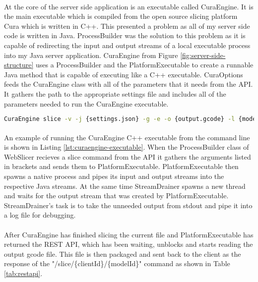 \paragraph{}
At the core of the server side application is an executable called CuraEngine. 
It is the main executable which is compiled from the open source slicing platform Cura which is written in C++. 
This presented a problem as all of my server side code is written in Java. 
ProcessBuilder was the solution to this problem as it is capable of redirecting the input and output streams of a local executable process into my Java server application.
CuraEngine from Figure \ref{fig:server-side-structure} uses a ProcessBuilder and the PlatformExecutable to create a runnable Java method that is capable of executing like a C++ executable.
CuraOptions feeds the CuraEngine class with all of the parameters that it needs from the API.
It gathers the path to the appropriate settings file and includes all of the parameters needed to run the CuraEngine executable.
\begin{lstlisting}[language=bash, style=thesiscode, label={lst:curaengine-executable}, caption=An example of running CuraEngine C++ executable directly from the command line.]
CuraEngine slice -v -j {settings.json} -g -e -o {output.gcode} -l {model-file.stl}
\end{lstlisting}

\paragraph{}
An example of running the CuraEngine C++ executable from the command line is shown in Listing \ref{lst:curaengine-executable}.
When the ProcessBuilder class of WebSlicer recieves a slice command from the API it gathers the arguments listed in brackets and sends them to PlatformExecutable.
PlatformExecutable then spawns a native process and pipes its input and output streams into the respective Java streams.
At the same time StreamDrainer spawns a new thread and waits for the output stream that was created by PlatformExecutable.
StreamDrainer's task is to take the unneeded output from stdout and pipe it into a log file for debugging.

\paragraph{}
After CuraEngine has finished slicing the current file and PlatformExecutable has returned the REST API, which has been waiting, unblocks and starts reading the output gcode file.
This file is then packaged and sent back to the client as the response of the "/slice/\{clientId\}/\{modelId\}" command as shown in Table \ref{tab:restapi}.

